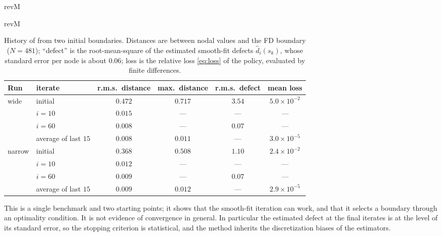 \begin{rv}{revM}{}
\begin{table}[htbp]
\begin{rv}{revM}{}
\centering\small
\caption{History of  from two initial boundaries. Distances are between nodal values
and the FD boundary ($N=481$); ``defect'' is the root-mean-square of the estimated smooth-fit defects
$\hat d_i(s_k)$, whose standard error per node is about $0.06$; loss is the relative loss
\eqref{eq:loss} of the policy, evaluated by finite differences.}\label{tab:alg}
\begin{tabular}{@{}llcccc@{}}
\toprule
Run & iterate & r.m.s.\ distance & max.\ distance & r.m.s.\ defect & mean loss\\
\midrule
wide & initial & $0.472$ & $0.717$ & $3.54$ & $5.0\times10^{-2}$\\
 & $i=10$ & $0.015$ & --- & --- & ---\\
 & $i=60$ & $0.008$ & --- & $0.07$ & ---\\
 & average of last $15$ & $0.008$ & $0.011$ & --- & $3.0\times10^{-5}$\\
\midrule
narrow & initial & $0.368$ & $0.508$ & $1.10$ & $2.4\times10^{-2}$\\
 & $i=10$ & $0.012$ & --- & --- & ---\\
 & $i=60$ & $0.009$ & --- & $0.07$ & ---\\
 & average of last $15$ & $0.009$ & $0.012$ & --- & $2.9\times10^{-5}$\\
\bottomrule
\end{tabular}
\end{rv}
\end{table}

This is a single benchmark and two starting points; it shows that the smooth-fit iteration can work,
and that it selects a boundary through an optimality condition. It is not evidence of convergence in general. In particular the
estimated defect at the final iterates is at the level of its standard error, so the stopping
criterion is statistical, and the method inherits the discretization biases of the estimators.
\end{rv}
